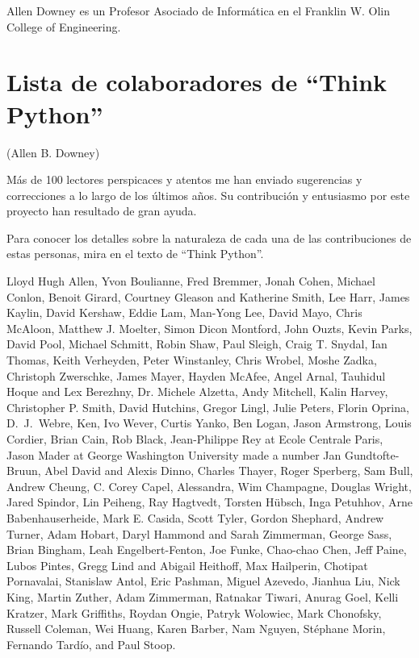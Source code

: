 Allen Downey es un Profesor Asociado de Informática en
el Franklin W. Olin College of Engineering.

\section*{Lista de colaboradores de ``Think Python''}


(Allen B. Downey)

Más de 100 lectores perspicaces y atentos me han enviado
sugerencias y correcciones a lo largo de los últimos años. Su
contribución y entusiasmo por este proyecto han resultado de
gran ayuda.

Para conocer los detalles sobre la naturaleza de cada una de las contribuciones
de estas personas, mira en el texto de ``Think Python''.

Lloyd Hugh Allen,
Yvon Boulianne,
Fred Bremmer,
Jonah Cohen,
Michael Conlon,
Benoit Girard,
Courtney Gleason and Katherine Smith,
Lee Harr,
James Kaylin,
David Kershaw,
Eddie Lam,
Man-Yong Lee,
David Mayo,
Chris McAloon,
Matthew J. Moelter,
Simon Dicon Montford,
John Ouzts,
Kevin Parks,
David Pool,
Michael Schmitt,
Robin Shaw,
Paul Sleigh,
Craig T. Snydal,
Ian Thomas,
Keith Verheyden,
Peter Winstanley,
Chris Wrobel,
Moshe Zadka,
Christoph Zwerschke,
James Mayer,
Hayden McAfee,
Angel Arnal,
Tauhidul Hoque and Lex Berezhny,
Dr. Michele Alzetta,
Andy Mitchell,
Kalin Harvey,
Christopher P. Smith,
David Hutchins,
Gregor Lingl,
Julie Peters,
Florin Oprina,
D.~J.~Webre,
Ken,
Ivo Wever,
Curtis Yanko,
Ben Logan,
Jason Armstrong,
Louis Cordier,
Brian Cain,
Rob Black,
Jean-Philippe Rey at Ecole Centrale Paris,
Jason Mader at George Washington University made a number
Jan Gundtofte-Bruun,
Abel David and Alexis Dinno,
Charles Thayer,
Roger Sperberg,
Sam Bull,
Andrew Cheung,
C. Corey Capel,
Alessandra,
Wim Champagne,
Douglas Wright,
Jared Spindor,
Lin Peiheng,
Ray Hagtvedt,
Torsten H\"{u}bsch,
Inga Petuhhov,
Arne Babenhauserheide,
Mark E. Casida,
Scott Tyler,
Gordon Shephard,
Andrew Turner,
Adam Hobart,
Daryl Hammond and Sarah Zimmerman,
George Sass,
Brian Bingham,
Leah Engelbert-Fenton,
Joe Funke,
Chao-chao Chen,
Jeff Paine,
Lubos Pintes,
Gregg Lind and Abigail Heithoff,
Max Hailperin,
Chotipat Pornavalai,
Stanislaw Antol,
Eric Pashman,
Miguel Azevedo,
Jianhua Liu,
Nick King,
Martin Zuther,
Adam Zimmerman,
Ratnakar Tiwari,
Anurag Goel,
Kelli Kratzer,
Mark Griffiths,
Roydan Ongie,
Patryk Wolowiec,
Mark Chonofsky,
Russell Coleman,
Wei Huang,
Karen Barber,
Nam Nguyen,
St\'{e}phane Morin,
Fernando Tard\'{i}o,
and
Paul Stoop.

